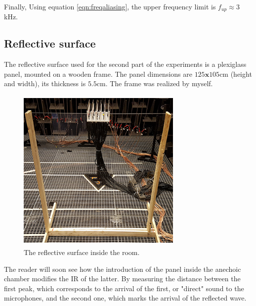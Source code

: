 Finally, Using equation \ref{eqn:freqaliasing}, the upper frequency limit is $f_{up} \approx 3$kHz.

\subsection{Reflective surface}{}
\label{subsec:reflector}

The reflective surface used for the second part of the experiments is a plexiglass panel, mounted on a wooden frame. The panel dimensions are $125\textbf{x}105$cm (height and width), its thickness is $5.5$cm. The frame was realized by myself.

\begin{figure}[H]
\centering
\includegraphics[width=8cm,height=8cm,keepaspectratio]{Figures/ref}
\decoRule
\caption[Reflective surface]{The reflective surface inside the room.}
\label{fig:refsurf}
\end{figure}

The reader will soon see how the introduction of the panel inside the anechoic chamber modifies the IR of the latter. By measuring the distance between the first peak, which corresponds to the arrival of the first, or "direct" sound to the microphones, and the second one, which marks the arrival of the reflected wave. 

